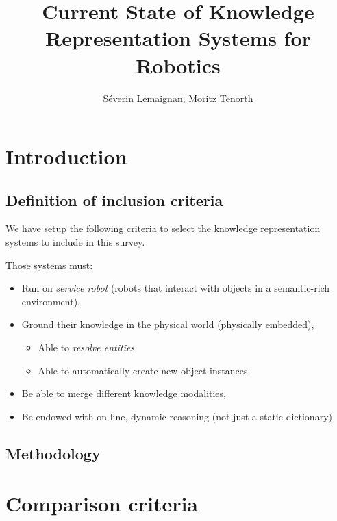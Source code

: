 \documentclass[a4paper]{article}
\title{Current State of Knowledge Representation Systems for Robotics}
\author{Séverin Lemaignan, Moritz Tenorth}
\begin{document}
\maketitle
\tableofcontents

\section{Introduction}
\label{sect|intro}

\subsection{Definition of inclusion criteria}

We have setup the following criteria to select the knowledge representation
systems to include in this survey.

Those systems must:

\begin{itemize}
	\item  Run on \emph{service robot} (robots that interact with objects in a
	semantic-rich environment),

	\item  Ground their knowledge in the physical world (physically embedded),
	\begin{itemize}
		\item  Able to \emph{resolve entities}
		\item  Able to automatically create new object instances
	\end{itemize}

	\item  Be able to merge different knowledge modalities,
	\item  Be endowed with on-line, dynamic reasoning (not just a static
	dictionary)

\end{itemize}

\subsection{Methodology}
\label{sect|methodology}


	
\section{Comparison criteria}
\label{sect|comparison-criteria}
\end{document}
